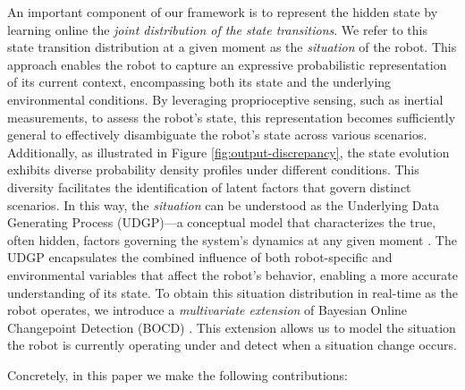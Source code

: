 \documentclass[Afour,sageh,times]{sagej}
\theoremstyle{lemma}
\begin{document}
An important component of our framework is to represent the hidden state by learning online the \textit{joint distribution of the state transitions}. We refer to this state transition distribution at a given moment as the \textit{situation} of the robot. This approach enables the robot to capture an expressive probabilistic representation of its current context, encompassing both its state and the underlying environmental conditions. By leveraging proprioceptive sensing, such as inertial measurements, to assess the robot's state, this representation becomes sufficiently general to effectively disambiguate the robot's state across various scenarios.  
Additionally, as illustrated in Figure \ref{fig:output-discrepancy}, the state evolution exhibits diverse probability density profiles under different conditions. This diversity facilitates the identification of latent factors that govern distinct scenarios.
In this way, the \textit{situation} can be understood as the Underlying Data Generating Process (UDGP)—a conceptual model that characterizes the true, often hidden, factors governing the system's dynamics at any given moment \cite[p. 109]{Goodfellow-et-al-2016}. The UDGP encapsulates the combined influence of both robot-specific and environmental variables that affect the robot’s behavior, enabling a more accurate understanding of its state. To obtain this situation distribution in real-time as the robot operates, we introduce a \textit{multivariate extension} of Bayesian Online Changepoint Detection (BOCD) \cite[]{adams2007bayesian}. This extension allows us to model the situation the robot is currently operating under and detect when a situation change occurs.

 Concretely, in this paper we make the following contributions:
\end{document}
